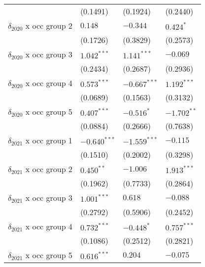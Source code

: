 \begin{tabular}{llll}
                                       &           (0.1491) &           (0.1924) &           (0.2440) \\
$\delta_{2020}$ x occ group 2          &            $0.148$ &           $-0.344$ &          $0.424^*$ \\
                                       &           (0.1726) &           (0.3829) &           (0.2573) \\
$\delta_{2020}$ x occ group 3          &      $1.042^{***}$ &      $1.141^{***}$ &           $-0.069$ \\
                                       &           (0.2434) &           (0.2687) &           (0.2936) \\
$\delta_{2020}$ x occ group 4          &      $0.573^{***}$ &     $-0.667^{***}$ &      $1.192^{***}$ \\
                                       &           (0.0689) &           (0.1563) &           (0.3132) \\
$\delta_{2020}$ x occ group 5          &      $0.407^{***}$ &         $-0.516^*$ &      $-1.702^{**}$ \\
                                       &           (0.0884) &           (0.2666) &           (0.7638) \\
$\delta_{2021}$ x occ group 1          &     $-0.640^{***}$ &     $-1.559^{***}$ &           $-0.115$ \\
                                       &           (0.1510) &           (0.2002) &           (0.3298) \\
$\delta_{2021}$ x occ group 2          &       $0.450^{**}$ &           $-1.006$ &      $1.913^{***}$ \\
                                       &           (0.1962) &           (0.7733) &           (0.2864) \\
$\delta_{2021}$ x occ group 3          &      $1.001^{***}$ &            $0.618$ &           $-0.088$ \\
                                       &           (0.2792) &           (0.5906) &           (0.2452) \\
$\delta_{2021}$ x occ group 4          &      $0.732^{***}$ &         $-0.448^*$ &      $0.757^{***}$ \\
                                       &           (0.1086) &           (0.2512) &           (0.2821) \\
$\delta_{2021}$ x occ group 5          &      $0.616^{***}$ &            $0.204$ &           $-0.075$ \\

\end{tabular}
